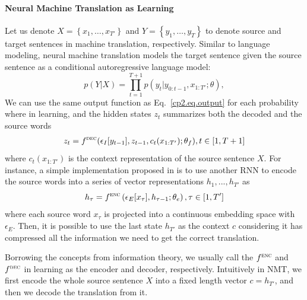 \paragraph{Neural Machine Translation as \sts Learning} 
Let us denote $X=\left\{ x_1, \ldots, x_{T'} \right\}$ and $Y=\left\{ y_1, \ldots, y_T \right\}$ to denote source and target sentences in machine translation, respectively. Similar to language modeling, neural machine translation models the target sentence given the source sentence as a conditional autoregressive language model:
\begin{equation}
	\label{cp2.eq.auto_sts}
    p(Y|X) =  \prod_{t=1}^{T+1}p(y_t|y_{0:t-1}, x_{1:T'}; \theta),
\end{equation}
We can use the same output function as Eq.~\ref{cp2.eq.output} for each probability where in \sts learning, and the hidden states $z_t$ summarizes both the decoded and the source words
\begin{equation}
    \label{cp2.eq.hidden_state}
    \begin{split}
         z_t = f^{\textsc{dec}}(\epsilon_I[y_{t-1}], z_{t-1}, c_t(x_{1:T'}); {\theta}_f), t \in [1, T+1]
    \end{split}
\end{equation}
where $c_t(x_{1:T'})$ is the context representation of the source sentence $X$. For instance, a simple implementation proposed in  is to use another RNN to encode the source words into a series of vector representations $h_1, ..., h_{T'}$ as 
\begin{equation}
    \label{cp2.eq.rnn_encoder}
    h_\tau = f^{\textsc{enc}}\left(\epsilon_{E}[x_\tau], h_{\tau-1}; \theta_e\right),  \tau \in [1, T']
\end{equation}
where each source word $x_\tau$ is projected into a continuous embedding space with $\epsilon_{E}$. Then, it is possible to use the last state $h_{T'}$ as the context $c$ considering it has compressed all the information we need to get the correct translation.

Borrowing the concepts from information theory, we usually call the $ f^{\textsc{enc}}$ and $ f^{\textsc{dec}}$ in \sts learning as the encoder and decoder, respectively. Intuitively in NMT, we first encode the whole source sentence $X$ into a fixed length vector $c = h_{T'}$, and then we decode the translation from it.

